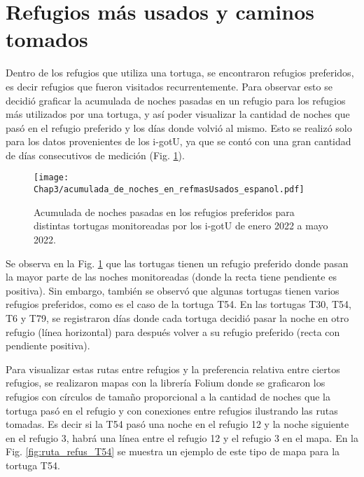 \section{Refugios más usados y caminos tomados}
Dentro de los refugios que utiliza una tortuga, se encontraron refugios preferidos, es decir refugios que fueron visitados recurrentemente. Para observar esto se decidió graficar la acumulada de noches pasadas en un refugio para los refugios más utilizados por una tortuga, y así poder visualizar la cantidad de noches que pasó en el refugio preferido y los días donde volvió al mismo. Esto se realizó solo para los datos provenientes de los i-gotU, ya que se contó con una gran cantidad de días consecutivos de medición (Fig. \ref{fig:refugios_preferidos}).
\begin{figure}[ht]
    \begin{center}
        \texttt{[image: Chap3/acumulada\_de\_noches\_en\_refmasUsados\_espanol.pdf]}
        \caption[Acumulada de noches pasadas en los refugios preferidos.]{Acumulada de noches pasadas en los refugios preferidos para distintas tortugas monitoreadas por los i-gotU de enero 2022 a mayo 2022.}
        \label{fig:refugios_preferidos}
       
        \end{center}
\end{figure}
Se observa en la Fig. \ref{fig:refugios_preferidos} que las tortugas tienen un refugio preferido donde pasan la mayor parte de las noches monitoreadas (donde la recta tiene pendiente es positiva). Sin embargo, también se observó que algunas tortugas tienen varios refugios preferidos, como es el caso de la tortuga T54. En las tortugas T30, T54, T6 y T79, se registraron días donde cada tortuga decidió pasar la noche en otro refugio (línea horizontal) para después volver a su refugio preferido (recta con pendiente positiva).
 
Para visualizar estas rutas entre refugios y la preferencia relativa entre ciertos refugios, se realizaron mapas con la librería Folium donde se graficaron los refugios con círculos de tamaño proporcional a la cantidad de noches que la tortuga pasó en el refugio y con conexiones entre refugios ilustrando las rutas tomadas. Es decir si la T54 pasó una noche en el refugio 12 y la noche siguiente en el refugio 3, habrá una línea entre el refugio 12 y el refugio 3 en el mapa. En la Fig. \ref{fig:ruta_refus_T54} se muestra un ejemplo de este tipo de mapa para la tortuga T54.
 
